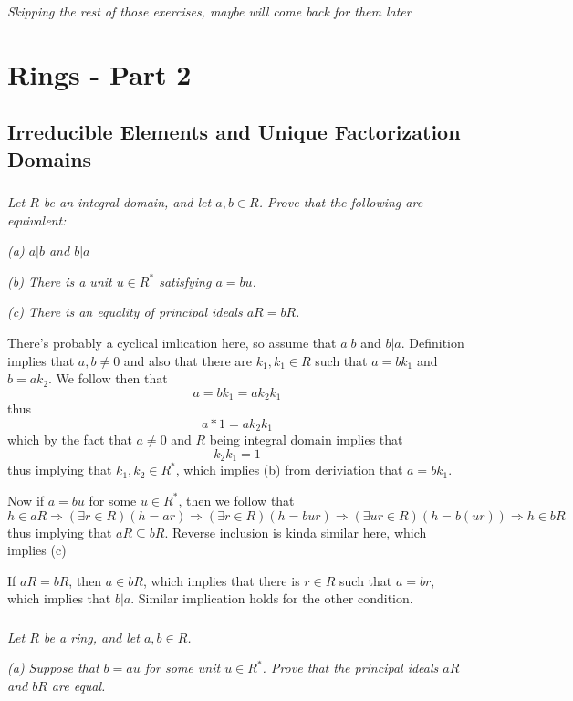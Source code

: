 \documentclass[11pt,oneside,titlepage]{book}
\DeclareMathOperator \ra {\Rightarrow}
\begin{document}
\textit{Skipping the rest of those exercises, maybe will come back for
  them later}

\chapter{Rings - Part 2}

\section{Irreducible Elements and Unique Factorization Domains}

\subsection{}

\textit{Let $R$ be an integral domain, and let $a, b \in R$. Prove
  that the following are equivalent:}

\textit{(a) $a | b$ and $b | a$ }

\textit{(b) There is a unit $u \in R^*$ satisfying $a = bu$. }

\textit{(c) There is an equality of principal ideals $aR = bR$.}

There's probably a cyclical imlication here, so assume that $a | b$ and $b | a$.
Definition implies that $a, b \neq 0$ and also that there are $k_1,
k_1 \in R$ such that $a = bk_1$ and $b = a k_2$. We follow then that
$$a = bk_1 = a k_2 k_1$$
thus
$$a * 1 = a k_2 k_1$$
which by the fact that $a \neq 0$ and $R$ being integral domain implies that
$$k_2 k_1 = 1$$
thus implying that $k_1, k_2 \in R^*$, which implies (b) from deriviation that
$a = bk_1$.

Now if $a = bu$ for some $u \in R^*$, then we follow that
$$h \in aR \ra (\exists r \in R)( h = ar) \ra
(\exists r \in R)( h = bur) \ra  (\exists ur \in R)( h = b(ur)) \ra h \in bR$$
thus implying that $aR \subseteq bR$. Reverse inclusion is kinda similar here,
which implies (c)

If $aR = bR$, then $a \in bR$, which implies that there is $r \in R$ such
that $a = br$, which implies that $b | a$. Similar implication holds
for the other condition.

\subsection{}

\textit{Let $R$ be a ring, and let $a, b \in R$. }

\textit{(a) Suppose that $b = au$ for some unit $u \in R^*$. Prove
that the principal ideals $aR$ and $bR$ are equal.}
\end{document}
